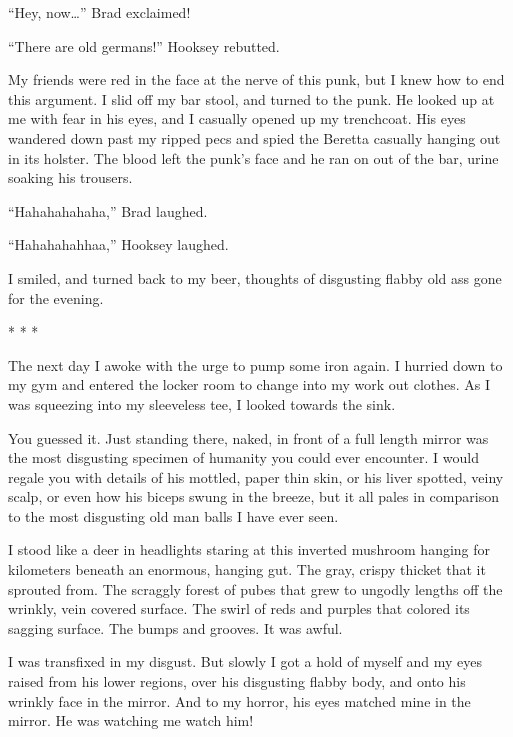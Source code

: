 ``Hey, now{\ldots}'' Brad exclaimed!

``There are old germans!'' Hooksey rebutted.



My friends were red in the face at the nerve of this punk, but I
knew how to end this argument. I slid off my bar stool, and turned
to the punk. He looked up at me with fear in his eyes, and I
casually opened up my trenchcoat. His eyes wandered down past my
ripped pecs and spied the Beretta casually hanging out in its
holster. The blood left the punk's face and he ran on out of the
bar, urine soaking his trousers.



``Hahahahahaha,'' Brad laughed.

``Hahahahahhaa,'' Hooksey laughed.



I smiled, and turned back to my beer, thoughts of disgusting flabby
old ass gone for the evening.



* * *




The next day I awoke with the urge to pump some iron again. I
hurried down to my gym and entered the locker room to change into
my work out clothes. As I was squeezing into my sleeveless tee, I
looked towards the sink.



You guessed it. Just standing there, naked, in front of a full
length mirror was the most disgusting specimen of humanity you
could ever encounter. I would regale you with details of his
mottled, paper thin skin, or his liver spotted, veiny scalp, or
even how his biceps swung in the breeze, but it all pales in
comparison to the most disgusting old man balls I have ever
seen.



I stood like a deer in headlights staring at this inverted mushroom
hanging for kilometers beneath an enormous, hanging gut. The gray,
crispy thicket that it sprouted from. The scraggly forest of pubes
that grew to ungodly lengths off the wrinkly, vein covered surface.
The swirl of reds and purples that colored its sagging surface. The
bumps and grooves. It was awful.



I was transfixed in my disgust. But slowly I got a hold of myself
and my eyes raised from his lower regions, over his disgusting
flabby body, and onto his wrinkly face in the mirror. And to my
horror, his eyes matched mine in the mirror. He was watching me
watch him!



